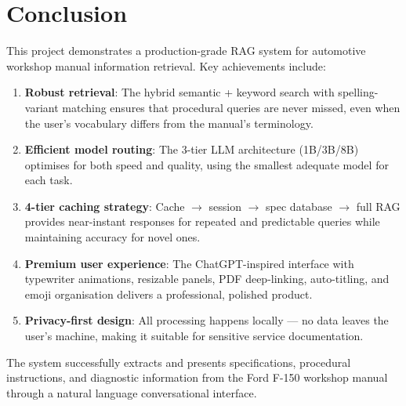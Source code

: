 \documentclass[12pt, a4paper]{article}
\begin{document}
\section{Conclusion}

This project demonstrates a production-grade RAG system for automotive workshop manual information retrieval. Key achievements include:

\begin{enumerate}[itemsep=4pt]
  \item \textbf{Robust retrieval}: The hybrid semantic + keyword search with spelling-variant matching ensures that procedural queries are never missed, even when the user's vocabulary differs from the manual's terminology.
  
  \item \textbf{Efficient model routing}: The 3-tier LLM architecture (1B/3B/8B) optimises for both speed and quality, using the smallest adequate model for each task.
  
  \item \textbf{4-tier caching strategy}: Cache $\rightarrow$ session $\rightarrow$ spec database $\rightarrow$ full RAG provides near-instant responses for repeated and predictable queries while maintaining accuracy for novel ones.
  
  \item \textbf{Premium user experience}: The ChatGPT-inspired interface with typewriter animations, resizable panels, PDF deep-linking, auto-titling, and emoji organisation delivers a professional, polished product.
  
  \item \textbf{Privacy-first design}: All processing happens locally — no data leaves the user's machine, making it suitable for sensitive service documentation.
\end{enumerate}

The system successfully extracts and presents specifications, procedural instructions, and diagnostic information from the Ford F-150 workshop manual through a natural language conversational interface.
\end{document}
